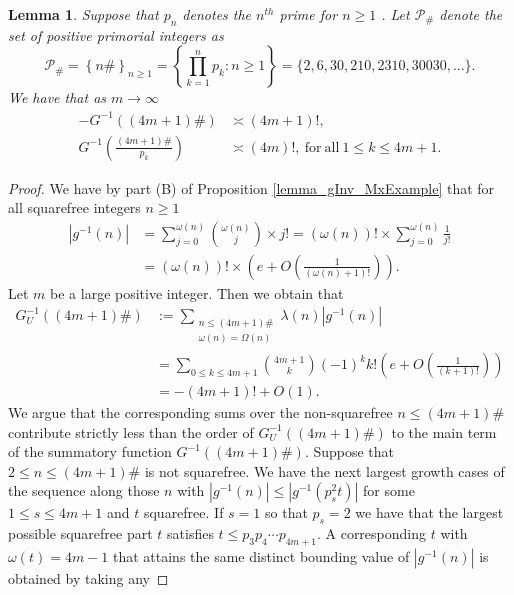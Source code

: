 \documentclass[11pt,reqno,a4letter]{article}
\numberwithin{figure}{section}
\numberwithin{table}{section}
\newcommand{\seqnum}[1]{\href{http://oeis.org/#1}{\color{ProcessBlue}{\underline{#1}}}}
\theoremstyle{plain}
\newtheorem{lemma}[theorem]{Lemma}
\numberwithin{theorem}{section}
\theoremstyle{definition}
\begin{document}
\begin{lemma}
\label{theorem_PrimorialSeqGInvCalcs_v1} 
Suppose that $p_n$ denotes the $n^{th}$ prime for $n \geq 1$ 
\cite[\seqnum{A000040}]{OEIS}. 
Let $\mathcal{P}_{\#}$ denote the set of positive primorial integers as 
\cite[\seqnum{A002110}]{OEIS} 
\[
\mathcal{P}_{\#} = \left\{n\#\right\}_{n \geq 1} = \left\{\prod_{k=1}^{n} p_k : n \geq 1\right\} = 
     \{2, 6, 30, 210, 2310, 30030, \ldots\}. 
\]
We have that as $m \rightarrow \infty$  
\begin{align*}
-G^{-1}((4m+1)\#) & \asymp (4m+1)!, \\ 
G^{-1}\left(\frac{(4m+1)\#}{p_k}\right) & \asymp (4m)!, 
     \mathrm{\ for\ all\ } 1 \leq k \leq 4m+1. 
\end{align*} 
\end{lemma}
\begin{proof} 
We have by part (B) of Proposition \ref{lemma_gInv_MxExample} 
that for all squarefree integers 
$n \geq 1$ 
\begin{align*} 
|g^{-1}(n)| & = \sum_{j=0}^{\omega(n)} \binom{\omega(n)}{j} \times j! 
     = (\omega(n))! \times \sum_{j=0}^{\omega(n)} \frac{1}{j!} \\ 
     & = (\omega(n))! \times \left(e + O\left(\frac{1}{(\omega(n)+1)!}\right)\right). 
\end{align*} 
Let $m$ be a large positive integer. 
Then we obtain that 
\begin{align*} 
G_{U}^{-1}((4m+1)\#) & := \sum_{\substack{n \leq (4m+1)\# \\ \omega(n)=\Omega(n)}} \lambda(n) |g^{-1}(n)| \\ 
     & = \sum_{0 \leq k \leq 4m+1} \binom{4m+1}{k} (-1)^{k} k! 
     \left(e + O\left(\frac{1}{(k+1)!}\right)\right) \\ 
     & = -(4m+1)! + O(1). 
\end{align*} 
We argue that the corresponding sums over the non-squarefree $n \leq (4m+1)\#$ 
contribute strictly less than the order of $G_{U}^{-1}((4m+1)\#)$ to the 
main term of the summatory function $G^{-1}((4m+1)\#)$. 
Suppose that $2 \leq n \leq (4m+1)\#$ is not squarefree. We have the next largest 
growth cases of the sequence along those $n$ with 
$|g^{-1}(n)| \leq |g^{-1}(p_s^2 t)|$ for some $1 \leq s \leq 4m+1$ and $t$ squarefree. 
If $s = 1$ so that $p_s = 2$ we have that the largest possible squarefree part $t$ 
satisfies $t \leq p_3p_4 \cdots p_{4m+1}$. 
A corresponding $t$ with $\omega(t) = 4m-1$ that attains the 
same distinct bounding value of $|g^{-1}(n)|$ is obtained by taking any 

\end{proof}
\end{document}
